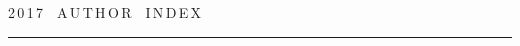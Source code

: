 




\def\stat{cont-e}

{%


\raggedleft\Large \bf%

2\,0\,1\,7\ \ A\,U\,T\,H\,O\,R\ \ I\,N\,D\,E\,X \vskip 17pt

 \hrule

 \par

 }



\label{st\stat}



\def\tit{\ }



\def\aut{\ }

\def\auf{\ }



\def\leftkol{\ } %



\def\rightkol{\ } %



\titele{\tit}{\aut}{\auf}{\leftkol}{\rightkol}




\def\leftfootline{\small{\textbf{\thepage}

\hfill INFORMATIKA I EE PRIMENENIYA~--- INFORMATICS AND APPLICATIONS\ \ \ 2017\

\ \ volume~11\ \ \ issue\ 4}

}%

 \def\rightfootline{\small{INFORMATIKA I EE PRIMENENIYA~--- INFORMATICS AND APPLICATIONS\ \ \ 2017\ \ \ volume~11\ \ \ issue\ 4

\hfill \textbf{\thepage}}}



\vspace*{-12pt}

\vspace*{-18pt}



\noindent


